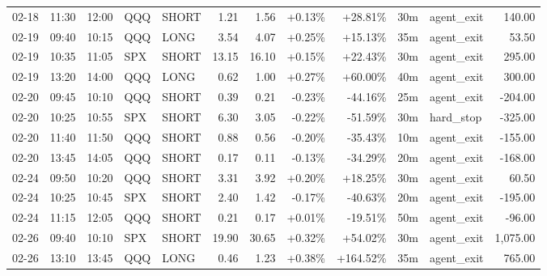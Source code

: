 \documentclass[11pt,a4paper,twoside]{article}
\begin{document}
\begin{center}
\begin{longtable}{>{\color{txtmain}}l l l l l r r r r r >{\color{txtmain}}l r}
02-18 & 11:30 & 12:00 & QQQ & SHORT & 1.21 & 1.56 & \textcolor{wingreen}{+0.13\%} & \textcolor{wingreen}{+28.81\%} & 30m & agent\_exit & \textcolor{wingreen}{140.00} \\
02-19 & 09:40 & 10:15 & QQQ & LONG & 3.54 & 4.07 & \textcolor{wingreen}{+0.25\%} & \textcolor{wingreen}{+15.13\%} & 35m & agent\_exit & \textcolor{wingreen}{53.50} \\
02-19 & 10:35 & 11:05 & SPX & SHORT & 13.15 & 16.10 & \textcolor{wingreen}{+0.15\%} & \textcolor{wingreen}{+22.43\%} & 30m & agent\_exit & \textcolor{wingreen}{295.00} \\
02-19 & 13:20 & 14:00 & QQQ & LONG & 0.62 & 1.00 & \textcolor{wingreen}{+0.27\%} & \textcolor{wingreen}{+60.00\%} & 40m & agent\_exit & \textcolor{wingreen}{300.00} \\
02-20 & 09:45 & 10:10 & QQQ & SHORT & 0.39 & 0.21 & \textcolor{lossred}{-0.23\%} & \textcolor{lossred}{-44.16\%} & 25m & agent\_exit & \textcolor{lossred}{-204.00} \\
02-20 & 10:25 & 10:55 & SPX & SHORT & 6.30 & 3.05 & \textcolor{lossred}{-0.22\%} & \textcolor{lossred}{-51.59\%} & 30m & hard\_stop & \textcolor{lossred}{-325.00} \\
02-20 & 11:40 & 11:50 & QQQ & SHORT & 0.88 & 0.56 & \textcolor{lossred}{-0.20\%} & \textcolor{lossred}{-35.43\%} & 10m & agent\_exit & \textcolor{lossred}{-155.00} \\
02-20 & 13:45 & 14:05 & QQQ & SHORT & 0.17 & 0.11 & \textcolor{lossred}{-0.13\%} & \textcolor{lossred}{-34.29\%} & 20m & agent\_exit & \textcolor{lossred}{-168.00} \\
02-24 & 09:50 & 10:20 & QQQ & SHORT & 3.31 & 3.92 & \textcolor{wingreen}{+0.20\%} & \textcolor{wingreen}{+18.25\%} & 30m & agent\_exit & \textcolor{wingreen}{60.50} \\
02-24 & 10:25 & 10:45 & SPX & SHORT & 2.40 & 1.42 & \textcolor{lossred}{-0.17\%} & \textcolor{lossred}{-40.63\%} & 20m & agent\_exit & \textcolor{lossred}{-195.00} \\
02-24 & 11:15 & 12:05 & QQQ & SHORT & 0.21 & 0.17 & \textcolor{wingreen}{+0.01\%} & \textcolor{lossred}{-19.51\%} & 50m & agent\_exit & \textcolor{lossred}{-96.00} \\
02-26 & 09:40 & 10:10 & SPX & SHORT & 19.90 & 30.65 & \textcolor{wingreen}{+0.32\%} & \textcolor{wingreen}{+54.02\%} & 30m & agent\_exit & \textcolor{wingreen}{1,075.00} \\
02-26 & 13:10 & 13:45 & QQQ & LONG & 0.46 & 1.23 & \textcolor{wingreen}{+0.38\%} & \textcolor{wingreen}{+164.52\%} & 35m & agent\_exit & \textcolor{wingreen}{765.00} \\

\end{longtable}
\end{center}
\end{document}
